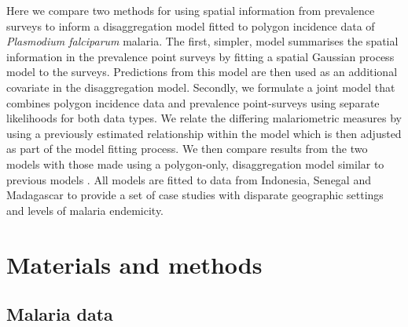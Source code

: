 \documentclass{statsoc}
\begin{document}


Here we compare two methods for using spatial information from prevalence surveys to inform a disaggregation model fitted to polygon incidence data of \emph{Plasmodium falciparum}  malaria.
The first, simpler, model summarises the spatial information in the prevalence point surveys by fitting a spatial Gaussian process model to the surveys.
Predictions from this model are then used as an additional covariate in the disaggregation model.
Secondly, we formulate a joint model that combines polygon incidence data and prevalence point-surveys using separate likelihoods for both data types.
We relate the differing malariometric measures by using a previously estimated relationship within the model \citep{cameron2015defining} which is then adjusted as part of the model fitting process.
We then compare results from the two models with those made using a polygon-only, disaggregation model similar to previous models \citep{sturrock2014fine, wilson2017pointless}.
All models are fitted to data from Indonesia, Senegal and Madagascar to provide a set of case studies with disparate geographic settings and levels of malaria endemicity.





\section*{Materials and methods}


\subsection*{Malaria data}
\end{document}

